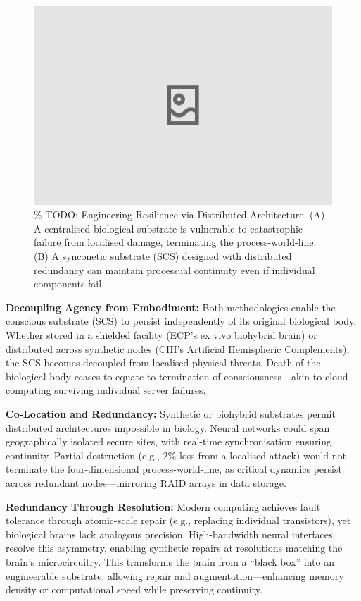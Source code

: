 \documentclass[10pt]{article}
\begin{document}
\begin{sloppypar}
  \begin{figure}[ht!]
    \centering
    \includegraphics[width=\textwidth]{figures/resilience-redundancy.png}
    \caption{\% TODO: Engineering Resilience via Distributed Architecture. (A) A centralised biological substrate is vulnerable to catastrophic failure from localised damage, terminating the process-world-line. (B) A synconetic substrate (SCS) designed with distributed redundancy can maintain processual continuity even if individual components fail.}
    \label{fig:resilience-redundancy}
  \end{figure}

  \textbf{Decoupling Agency from Embodiment:} Both methodologies enable the conscious substrate (SCS) to persist independently of its original biological body. Whether stored in a shielded facility (ECP’s ex vivo biohybrid brain) or distributed across synthetic nodes (CHI’s Artificial Hemispheric Complements), the SCS becomes decoupled from localised physical threats. Death of the biological body ceases to equate to termination of consciousness—akin to cloud computing surviving individual server failures.

  \textbf{Co-Location and Redundancy:} Synthetic or biohybrid substrates permit distributed architectures impossible in biology. Neural networks could span geographically isolated secure sites, with real-time synchronisation ensuring continuity. Partial destruction (e.g., 2\% loss from a localised attack) would not terminate the four-dimensional process-world-line, as critical dynamics persist across redundant nodes—mirroring RAID arrays in data storage.

  \textbf{Redundancy Through Resolution:} Modern computing achieves fault tolerance through atomic-scale repair (e.g., replacing individual transistors), yet biological brains lack analogous precision. High-bandwidth neural interfaces resolve this asymmetry, enabling synthetic repairs at resolutions matching the brain’s microcircuitry. This transforms the brain from a “black box” into an engineerable substrate, allowing repair and augmentation—enhancing memory density or computational speed while preserving continuity.


\end{sloppypar}
\end{document}
